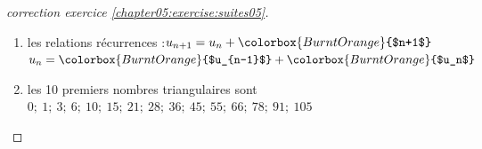 \documentclass[main.tex]{subfiles}
\begin{document}
\begin{proof}[correction exercice \ref{chapter05:exercise:suites05}] \hfill 
	
\newlength\radiusc
\pgfmathsetlength{\radius}{0.2cm}
\newcommand\drawballs[2][]{%
	\foreach \y [evaluate=\y as \yy using #2+1-\y] in {1,...,#2} {%
		\foreach \x in {1,...,\yy} {%
			\shade[shading=ball,ball color=white,#1] 
			({(2*\x-2+\y)*\radius},{sqrt(3)*\y*\radiusc}) circle (\radiusc); 
		};
	}%
}  	
\noindent\hfill 
{}
\hfill \null
\begin{enumerate}[label=\arabic*),leftmargin=*]
	\item  les relations récurrences :\hfill $u_{n+1}=u_n+\colorbox{BurntOrange}{$n+1$}$ \hfill $u_{n}=\colorbox{BurntOrange}{$u_{n-1}$}+\colorbox{BurntOrange}{$u_n$}$
	\item  les 10 premiers nombres triangulaires sont  \colorbox{BurntOrange}{$0;~ 1;~ 3;~ 6;~ 10;~ 15;~ 21;~ 28;~ 36;~ 45;~ 55;~ 66;~ 78;~ 91;~ 105$}
\end{enumerate}	
\end{proof}
\end{document}
